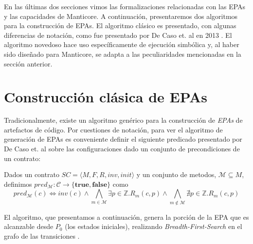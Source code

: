 En las últimas dos secciones vimos las formalizaciones relacionadas con las EPAs y las capacidades de Manticore.
A continuación, presentaremos dos algoritmos para la construcción de EPAs.
El algoritmo clásico es presentado, con algunas diferencias de notación, como fue presentado por De Caso et. al en 2013 \cite{de-caso-epa}.
El algoritmo novedoso hace uso específicamente de ejecución simbólica y, al haber sido diseñado para Manticore, se adapta a las peculiaridades mencionadas en la sección anterior.

\section{Construcción clásica de EPAs}
\label{sec:algoritmo-clasico}
Tradicionalmente, existe un algoritmo genérico para la construcción de \textit{EPAs} de artefactos de código.
Por cuestiones de notación, para ver el algoritmo de generación de EPAs es conveniente definir el siguiente predicado presentado por De Caso et. al \cite{de-caso-epa} sobre las configuraciones dado un conjunto de precondiciones de un contrato:

\begin{definition}
    Dados un contrato $SC = \langle M, F, R, inv, init \rangle$ y un conjunto de metodos, $\mathcal{M} \subseteq M$, definimos $pred_\mathcal{M} : \mathcal{C} \rightarrow \{\textbf{true}, \textbf{false}\}$ como
    \[pred_\mathcal{M}(c) \iff inv(c) \land \bigwedge\limits_{m \in \mathcal{M}} \exists p \in \mathds{Z} . R_m(c,p) \land \bigwedge\limits_{   m \notin \mathcal{M}} \nexists p \in \mathds{Z} . R_m(c,p)\]
\end{definition}
El algoritmo, que presentamos a continuación, genera la porción de la EPA que es alcanzable desde $P_0$ (los estados iniciales), realizando \textit{Breadth-First-Search} en el grafo de las transiciones \cite{de-caso-epa}.

